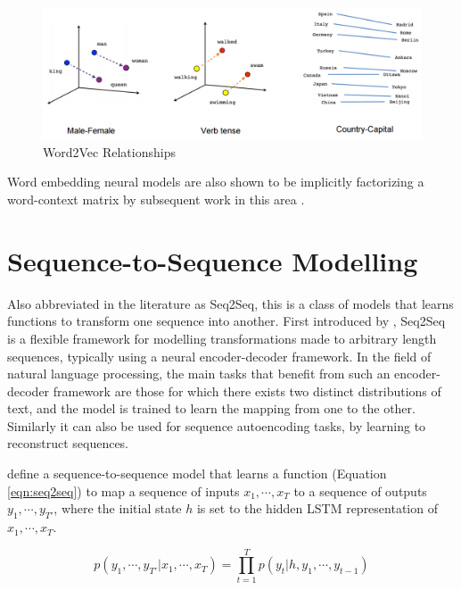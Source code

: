 \begin{figure}[ht]
	\centering
	\includegraphics[width=\textwidth]{images/word2vec-linear-relationships}
	\caption{\label{fig:word2vec-linear-relationships} Word2Vec Relationships}
\end{figure}

Word embedding neural models are also shown to be implicitly factorizing a word-context matrix by subsequent work in this area \citep{levy2014neural}.


\section{Sequence-to-Sequence Modelling}

Also abbreviated in the literature as Seq2Seq, this is a class of models that learns functions to transform one sequence into another. First introduced by \cite{sutskever2014sequence}, Seq2Seq is a flexible framework for modelling transformations made to arbitrary length sequences, typically using a neural encoder-decoder framework. In the field of natural language processing, the main tasks that benefit from such an encoder-decoder framework are those for which there exists two distinct distributions of text, and the model is trained to learn the mapping from one to the other. Similarly it can also be used for sequence autoencoding tasks, by learning to reconstruct sequences.

\cite{sutskever2014sequence} define a sequence-to-sequence model that learns a function (Equation \ref{eqn:seq2seq}) to map a sequence of inputs $x_1, \cdots , x_T$ to a sequence of outputs $y_1, \cdots , y_{T'}$, where the initial state $h$ is set to the hidden LSTM representation of $x_1, \cdots , x_T$.

\begin{equation} \label{eqn:seq2seq}
	p(y_1, \cdots , y_{T'} | x_1, \cdots , x_T) =	\prod_{t=1}^T p(y_t | h, y_1, \cdots , y_{t-1})
\end{equation}

